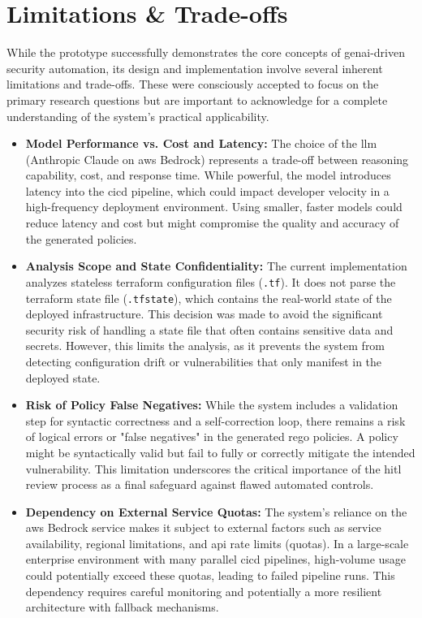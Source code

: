 \section{Limitations \& Trade-offs}
\label{sec:limitations}

While the prototype successfully demonstrates the core concepts of \gls{genai}-driven security automation, its design and implementation involve several inherent limitations and trade-offs. These were consciously accepted to focus on the primary research questions but are important to acknowledge for a complete understanding of the system's practical applicability.

\begin{itemize}
    \item \textbf{Model Performance vs. Cost and Latency:} The choice of the \gls{llm} (Anthropic Claude on \gls{aws} Bedrock) represents a trade-off between reasoning capability, cost, and response time. While powerful, the model introduces latency into the \gls{cicd} pipeline, which could impact developer velocity in a high-frequency deployment environment. Using smaller, faster models could reduce latency and cost but might compromise the quality and accuracy of the generated policies.
    
    \item \textbf{Analysis Scope and State Confidentiality:} The current implementation analyzes stateless \gls{terraform} configuration files (\texttt{.tf}). It does not parse the \gls{terraform} state file (\texttt{.tfstate}), which contains the real-world state of the deployed infrastructure. This decision was made to avoid the significant security risk of handling a state file that often contains sensitive data and secrets. However, this limits the analysis, as it prevents the system from detecting configuration drift or vulnerabilities that only manifest in the deployed state.

    \item \textbf{Risk of Policy False Negatives:} While the system includes a validation step for syntactic correctness and a self-correction loop, there remains a risk of logical errors or "false negatives" in the generated \gls{rego} policies. A policy might be syntactically valid but fail to fully or correctly mitigate the intended vulnerability. This limitation underscores the critical importance of the \gls{hitl} review process as a final safeguard against flawed automated controls.

    \item \textbf{Dependency on External Service Quotas:} The system's reliance on the \gls{aws} Bedrock service makes it subject to external factors such as service availability, regional limitations, and \gls{api} rate limits (quotas). In a large-scale enterprise environment with many parallel \gls{cicd} pipelines, high-volume usage could potentially exceed these quotas, leading to failed pipeline runs. This dependency requires careful monitoring and potentially a more resilient architecture with fallback mechanisms.
    

\end{itemize}
